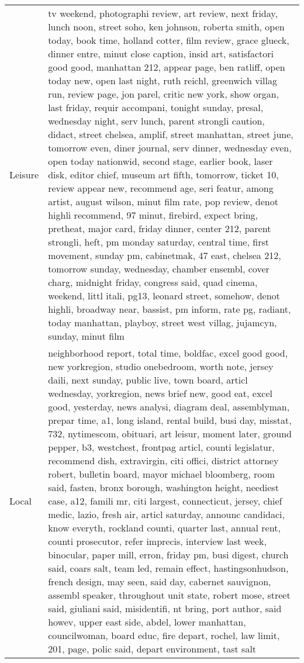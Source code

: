 \begin{longtable}{p{}p{}}
  Leisure & tv weekend, photographi review, art review, next friday, lunch noon, street soho, ken johnson, roberta smith, open today, book time, holland cotter, film review, grace glueck, dinner entre, minut close caption, insid art, satisfactori good good, manhattan 212, appear page, ben ratliff, open today new, open last night, ruth reichl, greenwich villag run, review page, jon parel, critic new york, show organ, last friday, requir accompani, tonight sunday, presal, wednesday night, serv lunch, parent strongli caution, didact, street chelsea, amplif, street manhattan, street june, tomorrow even, diner journal, serv dinner, wednesday even, open today nationwid, second stage, earlier book, laser disk, editor chief, museum art fifth, tomorrow, ticket 10, review appear new, recommend age, seri featur, among artist, august wilson, minut film rate, pop review, denot highli recommend, 97 minut, firebird, expect bring, pretheat, major card, friday dinner, center 212, parent strongli, heft, pm monday saturday, central time, first movement, sunday pm, cabinetmak, 47 east, chelsea 212, tomorrow sunday, wednesday, chamber ensembl, cover charg, midnight friday, congress said, quad cinema, weekend, littl itali, pg13, leonard street, somehow, denot highli, broadway near, bassist, pm inform, rate pg, radiant, today manhattan, playboy, street west villag, jujamcyn, sunday, minut film \\ 
  Local & neighborhood report, total time, boldfac, excel good good, new yorkregion, studio onebedroom, worth note, jersey daili, next sunday, public live, town board, articl wednesday, yorkregion, news brief new, good eat, excel good, yesterday, news analysi, diagram deal, assemblyman, prepar time, a1, long island, rental build, busi day, misstat, 732, nytimescom, obituari, art leisur, moment later, ground pepper, b3, westchest, frontpag articl, counti legislatur, recommend dish, extravirgin, citi offici, district attorney robert, bulletin board, mayor michael bloomberg, room said, fasten, bronx borough, washington height, neediest case, a12, famili mr, citi largest, connecticut, jersey, chief medic, lazio, fresh air, articl saturday, announc candidaci, know everyth, rockland counti, quarter last, annual rent, counti prosecutor, refer imprecis, interview last week, binocular, paper mill, erron, friday pm, busi digest, church said, coars salt, team led, remain effect, hastingsonhudson, french design, may seen, said day, cabernet sauvignon, assembl speaker, throughout unit state, robert mose, street said, giuliani said, misidentifi, nt bring, port author, said howev, upper east side, abdel, lower manhattan, councilwoman, board educ, fire depart, rochel, law limit, 201, page, polic said, depart environment, tast salt \\ 

\end{longtable}
